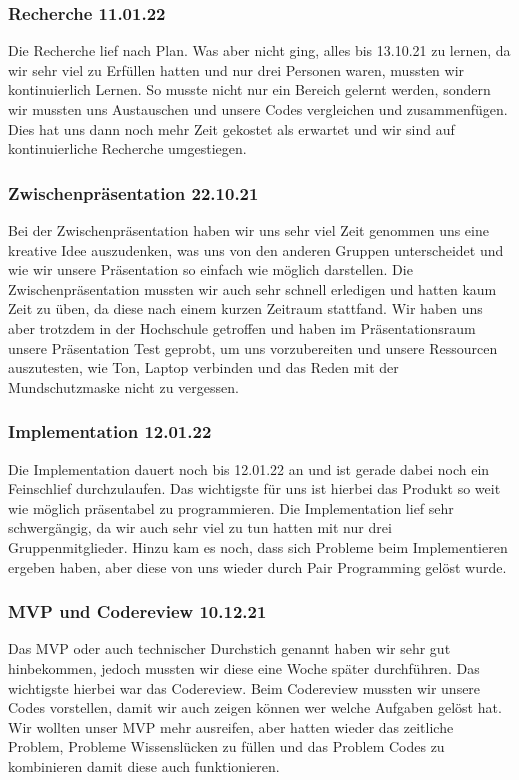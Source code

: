 \subsubsection{Recherche 11.01.22}
Die Recherche lief nach Plan. Was aber nicht ging, alles bis 13.10.21 zu lernen, 
da wir sehr viel zu Erfüllen hatten und nur drei Personen waren, mussten wir kontinuierlich Lernen. 
So musste nicht nur ein Bereich gelernt werden, sondern wir mussten uns Austauschen und unsere Codes vergleichen und zusammenfügen. 
Dies hat uns dann noch mehr Zeit gekostet als erwartet und wir sind auf kontinuierliche Recherche umgestiegen.

\subsubsection{Zwischenpräsentation 22.10.21}
Bei der Zwischenpräsentation haben wir uns sehr viel Zeit genommen uns eine kreative Idee auszudenken, 
was uns von den anderen Gruppen unterscheidet und wie wir unsere Präsentation so einfach wie möglich darstellen. 
Die Zwischenpräsentation mussten wir auch sehr schnell erledigen und hatten kaum Zeit zu üben, da diese nach einem kurzen Zeitraum stattfand. 
Wir haben uns aber trotzdem in der Hochschule getroffen und haben im Präsentationsraum unsere Präsentation Test geprobt, 
um uns vorzubereiten und unsere Ressourcen auszutesten, wie Ton, Laptop verbinden und das Reden mit der Mundschutzmaske nicht zu vergessen.

\subsubsection{Implementation 12.01.22}
Die Implementation dauert noch bis 12.01.22 an und ist gerade dabei noch ein Feinschlief durchzulaufen. 
Das wichtigste für uns ist hierbei das Produkt so weit wie möglich präsentabel zu programmieren. 
Die Implementation lief sehr schwergängig, da wir auch sehr viel zu tun hatten mit nur drei Gruppenmitglieder. 
Hinzu kam es noch, dass sich Probleme beim Implementieren ergeben haben, aber diese von uns wieder durch Pair Programming gelöst wurde. 

\subsubsection{MVP und Codereview 10.12.21}
Das MVP oder auch technischer Durchstich genannt haben wir sehr gut hinbekommen, jedoch mussten wir diese eine Woche später durchführen. 
Das wichtigste hierbei war das Codereview. Beim Codereview mussten wir unsere Codes vorstellen, damit wir auch zeigen können wer welche Aufgaben gelöst hat. 
Wir wollten unser MVP mehr ausreifen, aber hatten wieder das zeitliche Problem, Probleme Wissenslücken zu füllen und das Problem Codes zu kombinieren damit diese auch funktionieren. 


